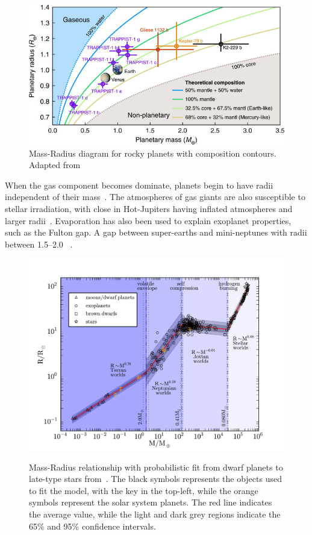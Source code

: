 \begin{figure}
    \centering
    \includegraphics[width=0.7\linewidth]{figures/introduction/santerne_2018}
    \caption[Mass-Radius diagram for rocky planets with composition contours.]{Mass-Radius diagram for rocky planets with composition contours.
        Adapted from~\citet{santerne_earthsized_2018}}
    \label{fig:santerne2018}
\end{figure}

When the gas component becomes dominate, planets begin to have radii independent of their mass~\citep[e.g.][]{lopez_understanding_2014}.
The atmospheres of gas giants are also susceptible to stellar irradiation, with close in Hot-Jupiters having inflated atmospheres and larger radii~\citep[e.g][]{fortney_interior_2010}.
Evaporation has also been used to explain exoplanet properties, such as the Fulton gap. A gap between super-earths and mini-neptunes with radii between 1.5--2.0 \Rearth{}~\citep{fulton_californiakepler_2017}.

\begin{figure}
    \centering
    \includegraphics[width=0.7\linewidth]{./figures/introduction/mass_radius_relation.pdf}  \\
    \caption[Mass-Radius relationship with probabilistic fit.]{Mass-Radius relationship with probabilistic fit from dwarf planets to late-type stars from~\citet{chen_probabilistic_2016}.
    The black symbols represents the objects used to fit the model, with the key in the top-left, while the orange symbols represent the solar system planets.
    The red line indicates the average value, while the light and dark grey regions indicate the 65\% and 95\% confidence intervals.}
    \label{fig:mass_radius_relation}
\end{figure}

